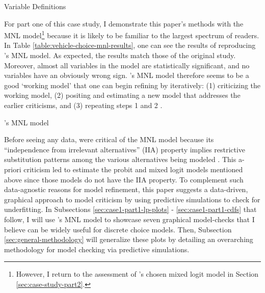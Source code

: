 \documentclass[preprint]{elsarticle}
\begin{document}
\begin{table}
\centering

\caption{Variable Definitions}
\label{table:variable-definitions-vehicle-choice}
\end{table}

For part one of this case study, I demonstrate this paper's methods with the MNL model\footnote{However, I return to the assessment of \citeauthor{brownstone_forecasting_1998}'s chosen mixed logit model in Section \ref{sec:case-study-part2}.} because it is likely to be familiar to the largest spectrum of readers. In Table \ref{table:vehicle-choice-mnl-results}, one can see the results of reproducing \citeauthor{brownstone_forecasting_1998}'s MNL model. As expected, the results match those of the original study. Moreover, almost all variables in the model are statistically significant, and no variables have an obviously wrong sign. \citeauthor{brownstone_forecasting_1998}'s MNL model therefore seems to be a good `working model' that one can begin refining by iteratively: (1) criticizing the working model, (2) positing and estimating a new model that addresses the earlier criticisms, and (3) repeating steps 1 and 2 \citep[p.795]{box_science_1976}.

\begin{table}
\centering

\caption{\citeauthor{brownstone_forecasting_1998}'s MNL model}
\label{table:vehicle-choice-mnl-results}
\end{table}

Before seeing any data, \citeauthor{brownstone_forecasting_1998} were critical of the MNL model because its ``independence from irrelevant alternatives'' (IIA) property implies restrictive substitution patterns among the various alternatives being modeled \citep[pp.109-110]{brownstone_forecasting_1998}. This a-priori criticism led \citeauthor{brownstone_forecasting_1998} to estimate the probit and mixed logit models mentioned above since those models do not have the IIA property. To complement such data-agnostic reasons for model refinement, this paper suggests a data-driven, graphical approach to model criticism by using predictive simulations to check for underfitting. In Subsections \ref{sec:case1-part1-lp-plots} - \ref{sec:case1-part1-cdfs} that follow, I will use  \citeauthor{brownstone_forecasting_1998}'s MNL model to showcase seven graphical model-checks that I believe can be widely useful for discrete choice models. Then, Subsection \ref{sec:general-methodology} will generalize these plots by detailing an overarching methodology for model checking via predictive simulations.
\end{document}
